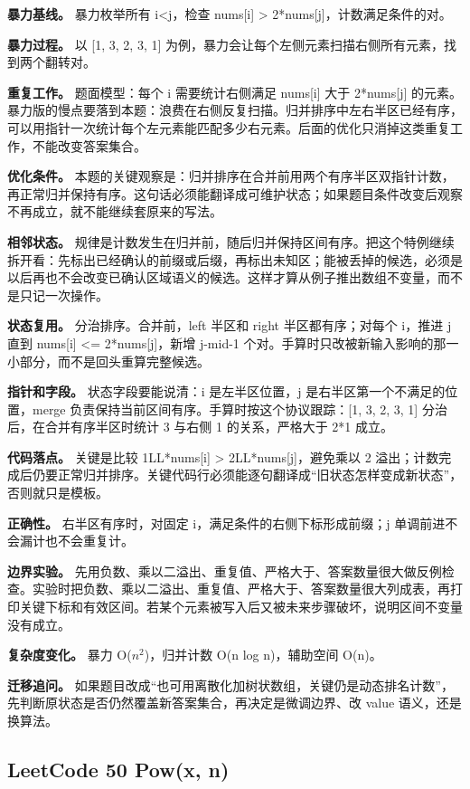 \textbf{暴力基线。} 暴力枚举所有 i<j，检查 nums[i] > 2*nums[j]，计数满足条件的对。

\textbf{暴力过程。} 以 [1, 3, 2, 3, 1] 为例，暴力会让每个左侧元素扫描右侧所有元素，找到两个翻转对。

\textbf{重复工作。} 题面模型：每个 i 需要统计右侧满足 nums[i] 大于 2*nums[j] 的元素。暴力版的慢点要落到本题：浪费在右侧反复扫描。归并排序中左右半区已经有序，可以用指针一次统计每个左元素能匹配多少右元素。后面的优化只消掉这类重复工作，不能改变答案集合。

\textbf{优化条件。} 本题的关键观察是：归并排序在合并前用两个有序半区双指针计数，再正常归并保持有序。这句话必须能翻译成可维护状态；如果题目条件改变后观察不再成立，就不能继续套原来的写法。

\textbf{相邻状态。} 规律是计数发生在归并前，随后归并保持区间有序。把这个特例继续拆开看：先标出已经确认的前缀或后缀，再标出未知区；能被丢掉的候选，必须是以后再也不会改变已确认区域语义的候选。这样才算从例子推出数组不变量，而不是只记一次操作。

\textbf{状态复用。} 分治排序。合并前，left 半区和 right 半区都有序；对每个 i，推进 j 直到 nums[i] <= 2*nums[j]，新增 j-mid-1 个对。手算时只改被新输入影响的那一小部分，而不是回头重算完整候选。

\textbf{指针和字段。} 状态字段要能说清：i 是左半区位置，j 是右半区第一个不满足的位置，merge 负责保持当前区间有序。手算时按这个协议跟踪：[1, 3, 2, 3, 1] 分治后，在合并有序半区时统计 3 与右侧 1 的关系，严格大于 2*1 成立。

\textbf{代码落点。} 关键是比较 1LL*nums[i] > 2LL*nums[j]，避免乘以 2 溢出；计数完成后仍要正常归并排序。关键代码行必须能逐句翻译成“旧状态怎样变成新状态”，否则就只是模板。

\textbf{正确性。} 右半区有序时，对固定 i，满足条件的右侧下标形成前缀；j 单调前进不会漏计也不会重复计。

\textbf{边界实验。} 先用负数、乘以二溢出、重复值、严格大于、答案数量很大做反例检查。实验时把负数、乘以二溢出、重复值、严格大于、答案数量很大列成表，再打印关键下标和有效区间。若某个元素被写入后又被未来步骤破坏，说明区间不变量没有成立。

\textbf{复杂度变化。} 暴力 O(\ensuremath{n^{2}})，归并计数 O(n log n)，辅助空间 O(n)。

\textbf{迁移追问。} 如果题目改成“也可用离散化加树状数组，关键仍是动态排名计数”，先判断原状态是否仍然覆盖新答案集合，再决定是微调边界、改 value 语义，还是换算法。

\subsection{LeetCode 50 Pow(x, n)}

